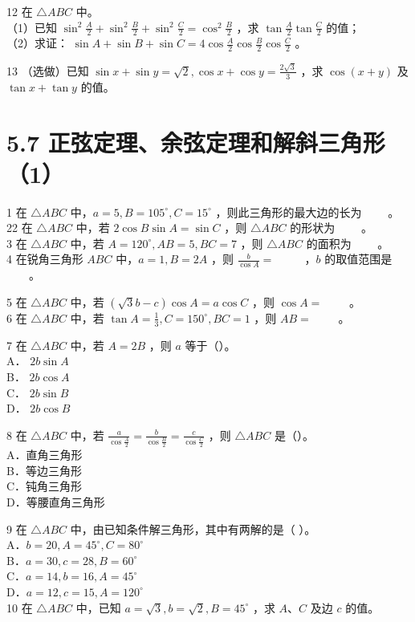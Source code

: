\documentclass[10pt]{article}
\begin{document}
12 在 \(\triangle A B C\) 中。\\
（1）已知 \(\sin ^{2} \frac{A}{2}+\sin ^{2} \frac{B}{2}+\sin ^{2} \frac{C}{2}=\cos ^{2} \frac{B}{2}\) ，求 \(\tan \frac{A}{2} \tan \frac{C}{2}\) 的值；\\
（2）求证： \(\sin A+\sin B+\sin C=4 \cos \frac{A}{2} \cos \frac{B}{2} \cos \frac{C}{2}\) 。

13 （选做）已知 \(\sin x+\sin y=\sqrt{2}, \cos x+\cos y=\frac{2 \sqrt{3}}{3}\) ，求 \(\cos (x+y)\) 及 \(\tan x+\tan y\) 的值。

\section*{5.7 正弦定理、余弦定理和解斜三角形（1）}
1 在 \(\triangle A B C\) 中，\(a=5, B=105^{\circ}, C=15^{\circ}\) ，则此三角形的最大边的长为 \(\qquad\)。\\
22 在 \(\triangle A B C\) 中，若 \(2 \cos B \sin A=\sin C\) ，则 \(\triangle A B C\) 的形状为 \(\qquad\)。\\
3 在 \(\triangle A B C\) 中，若 \(A=120^{\circ}, A B=5, B C=7\) ，则 \(\triangle A B C\) 的面积为 \(\qquad\)。\\
4 在锐角三角形 \(A B C\) 中，\(a=1, B=2 A\) ，则 \(\frac{b}{\cos A}=\) \(\qquad\) ，\(b\) 的取值范围是 \(\qquad\)。

5 在 \(\triangle A B C\) 中，若 \((\sqrt{3} b-c) \cos A=a \cos C\) ，则 \(\cos A=\) \(\qquad\)。\\
6 在 \(\triangle A B C\) 中，若 \(\tan A=\frac{1}{3}, C=150^{\circ}, B C=1\) ，则 \(A B=\) \(\qquad\)。

7 在 \(\triangle A B C\) 中，若 \(A=2 B\) ，则 \(a\) 等于（）。\\
A． \(2 b \sin A\)\\
B． \(2 b \cos A\)\\
C． \(2 b \sin B\)\\
D． \(2 b \cos B\)

8 在 \(\triangle A B C\) 中，若 \(\frac{a}{\cos \frac{A}{2}}=\frac{b}{\cos \frac{B}{2}}=\frac{c}{\cos \frac{C}{2}}\) ，则 \(\triangle A B C\) 是（）。\\
A．直角三角形\\
B．等边三角形\\
C．钝角三角形\\
D．等腰直角三角形

9 在 \(\triangle A B C\) 中，由已知条件解三角形，其中有两解的是（ ）。\\
A．\(b=20, A=45^{\circ}, C=80^{\circ}\)\\
B．\(a=30, c=28, B=60^{\circ}\)\\
C．\(a=14, b=16, A=45^{\circ}\)\\
D．\(a=12, c=15, A=120^{\circ}\)\\
10 在 \(\triangle A B C\) 中，已知 \(a=\sqrt{3}, b=\sqrt{2}, B=45^{\circ}\) ，求 \(A 、 C\) 及边 \(c\) 的值。
\end{document}
